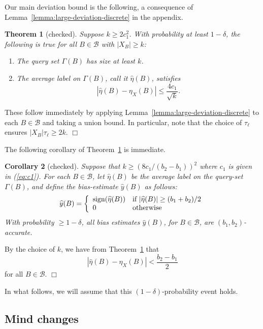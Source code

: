 \documentclass{article}
\def\B{{\mathcal B}}
\def\yh{{\widehat{y}}}
\def\sign{{\rm sign}}
\newtheorem{thm}{Theorem}
\newtheorem{cor}[thm]{Corollary}
\newenvironment{proof}{\noindent {\sc Proof:}}{$\Box$ \medskip}
\begin{document}
Our main deviation bound is the following, a consequence of Lemma~\ref{lemma:large-deviation-discrete} in the appendix.
\begin{thm}[checked]
Suppose $k \geq 2c_1^2$. With probability at least $1-\delta$, the following is true for all $B \in \B$ with $|X_B| \geq k$:
\begin{enumerate}
\item[(a)] The query set $\Gamma(B)$ has size at least $k$.
\item[(b)] The average label on $\Gamma(B)$, call it $\widehat{\eta}(B)$, satisfies
$$ \left| \widehat{\eta}(B) - \eta_X(B) \right| \leq \frac{4c_1}{\sqrt{k}}.$$
\end{enumerate}
\label{thm:large-deviation-bounds}
\end{thm}
\begin{proof}
These follow immediately by applying Lemma~\ref{lemma:large-deviation-discrete} to each $B \in \B$ and taking a union bound. In particular, note that the choice of $\tau_\ell$ ensures $|X_B| \tau_\ell \geq 2k$.
\end{proof}

The following corollary of Theorem~\ref{thm:large-deviation-bounds} is immediate.
\begin{cor}[checked]
Suppose that $k \geq (8c_1/(b_2-b_1))^2$ where $c_1$ is given in (\ref{eq:c1}). 
For each $B \in \B$, let $\widehat{\eta}(B)$ be the average label on the query-set $\Gamma(B)$, and define the bias-estimate $\yh(B)$ as follows:
$$ \yh(B)
= 
\left\{
\begin{array}{ll}
\sign(\widehat{\eta}(B)) & \mbox{if $|\widehat{\eta}(B)| \geq (b_1 + b_2)/2$} \\
0 & \mbox{otherwise}
\end{array}
\right.
$$
With probability $\geq 1-\delta$, all bias estimates $\yh(B)$, for $B \in \B$, are $(b_1,b_2)$-accurate.
\label{cor:accurate-bias-estimates}
\end{cor}
\begin{proof}
By the choice of $k$, we have from Theorem~\ref{thm:large-deviation-bounds} that 
$$ \left| \widehat{\eta}(B) - \eta_X(B) \right| < \frac{b_2 - b_1}{2} $$
for all $B \in \B$.
\end{proof}

In what follows, we will assume that this $(1-\delta)$-probability event holds.

\subsection{Mind changes}
\end{document}
